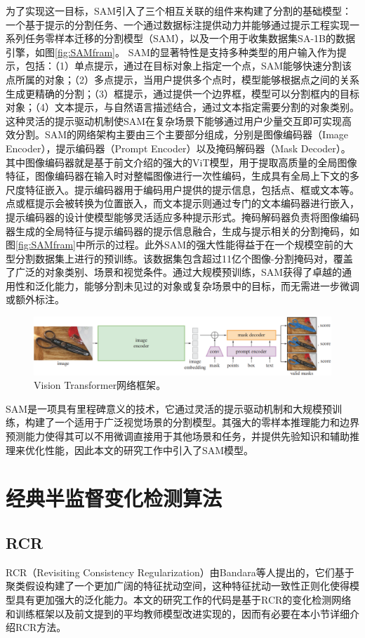 \documentclass[lang=chs, degree=master, blindreview=false, adobe=false]{yanputhesis}
\begin{document}
为了实现这一目标，SAM引入了三个相互关联的组件来构建了分割的基础模型：一个基于提示的分割任务、一个通过数据标注提供动力并能够通过提示工程实现一系列任务零样本迁移的分割模型（SAM），以及一个用于收集数据集SA-1B的数据引擎，如图\ref{fig:SAMfram}。
SAM的显著特性是支持多种类型的用户输入作为提示，包括：（1）单点提示，通过在目标对象上指定一个点，SAM能够快速分割该点所属的对象；（2）多点提示，当用户提供多个点时，模型能够根据点之间的关系生成更精确的分割；（3）框提示，通过提供一个边界框，模型可以分割框内的目标对象；（4）文本提示，与自然语言描述结合，通过文本指定需要分割的对象类别。这种灵活的提示驱动机制使SAM在复杂场景下能够通过用户少量交互即可实现高效分割。SAM的网络架构主要由三个主要部分组成，分别是图像编码器（Image Encoder），提示编码器（Prompt Encoder）以及掩码解码器（Mask Decoder）。其中图像编码器就是基于前文介绍的强大的ViT模型，用于提取高质量的全局图像特征，图像编码器在输入时对整幅图像进行一次性编码，生成具有全局上下文的多尺度特征嵌入。提示编码器用于编码用户提供的提示信息，包括点、框或文本等。点或框提示会被转换为位置嵌入，而文本提示则通过专门的文本编码器进行嵌入，提示编码器的设计使模型能够灵活适应多种提示形式。掩码解码器负责将图像编码器生成的全局特征与提示编码器的提示信息融合，生成与提示相关的分割掩码，如图\ref{fig:SAMfram}中所示的过程。此外SAM的强大性能得益于在一个规模空前的大型分割数据集上进行的预训练。该数据集包含超过11亿个图像-分割掩码对，覆盖了广泛的对象类别、场景和视觉条件。通过大规模预训练，SAM获得了卓越的通用性和泛化能力，能够分割未见过的对象或复杂场景中的目标，而无需进一步微调或额外标注。
\begin{figure}[htb]
  \centering
  \includegraphics[scale=0.9]{images/SAM.png}
  \caption{
    Vision Transformer网络框架\cite{kirillov2023SAM}。
  }
  \label{fig:ViTfram}
\end{figure}

SAM是一项具有里程碑意义的技术，它通过灵活的提示驱动机制和大规模预训练，构建了一个适用于广泛视觉场景的分割模型。其强大的零样本推理能力和边界预测能力使得其可以不用微调直接用于其他场景和任务，并提供先验知识和辅助推理来优化性能，因此本文的研究工作中引入了SAM模型。
\section{经典半监督变化检测算法}
\subsection{RCR}
RCR（Revisiting Consistency Regularization）由Bandara等人\cite{bandara2022RCR}提出的，它们基于聚类假设构建了一个更加广阔的特征扰动空间，这种特征扰动一致性正则化使得模型具有更加强大的泛化能力。本文的研究工作的代码是基于RCR的变化检测网络和训练框架以及前文提到的平均教师模型改进实现的，因而有必要在本小节详细介绍RCR方法。
\end{document}
